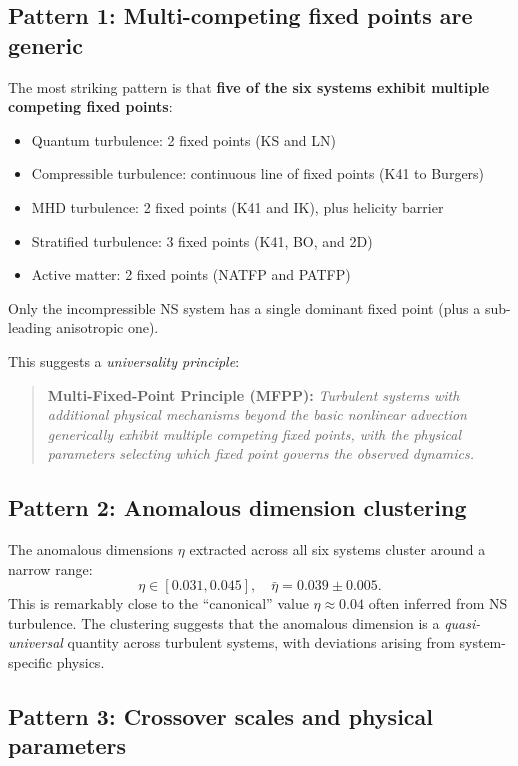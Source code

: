\subsection{Pattern 1: Multi-competing fixed points are generic}

The most striking pattern is that \textbf{five of the six systems exhibit multiple competing fixed points}:
\begin{itemize}
\item Quantum turbulence: 2 fixed points (KS and LN)
\item Compressible turbulence: continuous line of fixed points (K41 to Burgers)
\item MHD turbulence: 2 fixed points (K41 and IK), plus helicity barrier
\item Stratified turbulence: 3 fixed points (K41, BO, and 2D)
\item Active matter: 2 fixed points (NATFP and PATFP)
\end{itemize}
Only the incompressible NS system has a single dominant fixed point (plus a sub-leading anisotropic one).

This suggests a \emph{universality principle}:

\begin{quote}
\textbf{Multi-Fixed-Point Principle (MFPP):} \emph{Turbulent systems with additional physical mechanisms beyond the basic nonlinear advection generically exhibit multiple competing fixed points, with the physical parameters selecting which fixed point governs the observed dynamics.}
\end{quote}

\subsection{Pattern 2: Anomalous dimension clustering}

The anomalous dimensions $\eta$ extracted across all six systems cluster around a narrow range:
\begin{equation}\label{eq:eta_cluster}
\eta \in [0.031, 0.045], \quad \bar{\eta} = 0.039 \pm 0.005.
\end{equation}
This is remarkably close to the ``canonical'' value $\eta \approx 0.04$ often inferred from NS turbulence. The clustering suggests that the anomalous dimension is a \emph{quasi-universal} quantity across turbulent systems, with deviations arising from system-specific physics.

\subsection{Pattern 3: Crossover scales and physical parameters}

